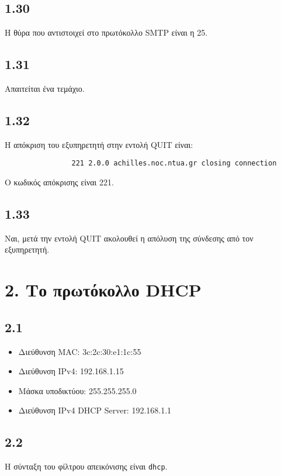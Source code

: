 		\subsection*{1.30} 
			Η θύρα που αντιστοιχεί στο πρωτόκολλο SMTP είναι η 25. 

		\subsection*{1.31} 
			Απαιτείται ένα τεμάχιο.

		\subsection*{1.32} 
			Η απόκριση του εξυπηρετητή στην εντολή QUIT είναι: 
			
			\begin{verbatim}
				221 2.0.0 achilles.noc.ntua.gr closing connection
			\end{verbatim}
			
			Ο κωδικός απόκρισης είναι 221.

		\subsection*{1.33} 
			Ναι, μετά την εντολή QUIT ακολουθεί η απόλυση της σύνδεσης από τον εξυπηρετητή.
	
	\section*{2. Το πρωτόκολλο DHCP}
					
		\subsection*{2.1}
			\begin{itemize}
				\item Διεύθυνση MAC: 3c:2c:30:e1:1c:55
				\item Διεύθυνση IPv4: 192.168.1.15
				\item Μάσκα υποδικτύου: 255.255.255.0
				\item Διεύθυνση IPv4 DHCP Server: 192.168.1.1	
			\end{itemize}
			
		\subsection*{2.2}
			Η σύνταξη του φίλτρου απεικόνισης είναι \verb|dhcp|.

